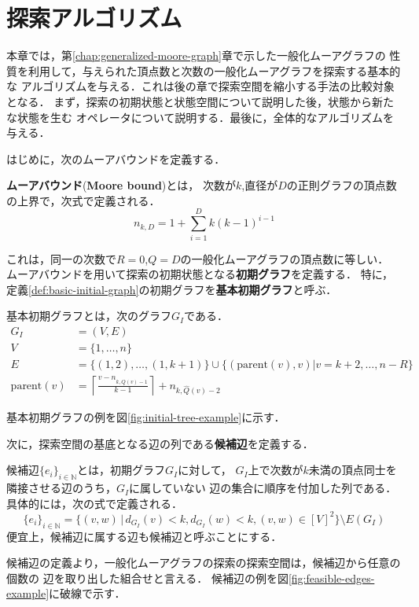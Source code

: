 
\chapter{探索アルゴリズム}
\label{chap:basic-algorithm}
本章では，第\ref{chap:generalized-moore-graph}章で示した一般化ムーアグラフの
性質を利用して，与えられた頂点数と次数の一般化ムーアグラフを探索する基本的な
アルゴリズムを与える．これは後の章で探索空間を縮小する手法の比較対象となる．
まず，探索の初期状態と状態空間について説明した後，状態から新たな状態を生む
オペレータについて説明する．最後に，全体的なアルゴリズムを与える．

はじめに，次のムーアバウンドを定義する．
\begin{definition}\rm
  \textbf{ムーアバウンド}(\textbf{Moore bound})とは，
  次数が$k$,直径が$D$の正則グラフの頂点数の上界で，次式で定義される．
  \begin{equation}
    n_{k,D} = 1 + \sum_{i=1}^Dk(k-1)^{i-1}
  \end{equation}
\end{definition}
これは，同一の次数で$R=0$,$Q=D$の一般化ムーアグラフの頂点数に等しい．
ムーアバウンドを用いて探索の初期状態となる\textbf{初期グラフ}を定義する．
特に，定義\ref{def:basic-initial-graph}の初期グラフを\textbf{基本初期グラフ}と呼ぶ．
\begin{definition}\rm
  \label{def:basic-initial-graph}
  基本初期グラフとは，次のグラフ$G_I$である．
  \begin{equation}
    \begin{aligned}
      \label{eq:basic-initial-graph}
      G_I&=(V,E) \\
      V&=\{1,\ldots,n\} \\
      E&=\{(1,2),\ldots,(1,k+1)\}\cup
      \{(\text{parent}(v),v)|v=k+2,\ldots,n-R\} \\
      \text{parent}(v)&=
      \left\lceil\frac{v-n_{k,\hat{Q}(v)-1}}{k-1}\right\rceil+n_{k,\hat{Q}(v)-2}
    \end{aligned}
  \end{equation}
\end{definition}
基本初期グラフの例を図\ref{fig:initial-tree-example}に示す．

次に，探索空間の基底となる辺の列である\textbf{候補辺}を定義する．
\begin{definition}\rm
  \label{def:candidate-edges}
  候補辺$\{e_i\}_{i\in\mathbb{N}}$とは，初期グラフ$G_I$に対して，
  $G_I$上で次数が$k$未満の頂点同士を隣接させる辺のうち，$G_I$に属していない
  辺の集合に順序を付加した列である．具体的には，次の式で定義される．
  \begin{equation}
    \{e_i\}_{i\in\mathbb{N}} =
    \{(v,w)\,|\,d_{G_I}(v)<k,d_{G_I}(w)<k,(v,w)\in[V]^2\}\setminus E(G_I)
  \end{equation}
  便宜上，候補辺に属する辺も候補辺と呼ぶことにする．
\end{definition}
候補辺の定義より，一般化ムーアグラフの探索の探索空間は，候補辺から任意の個数の
辺を取り出した組合せと言える．
候補辺の例を図\ref{fig:feasible-edges-example}に破線で示す．

